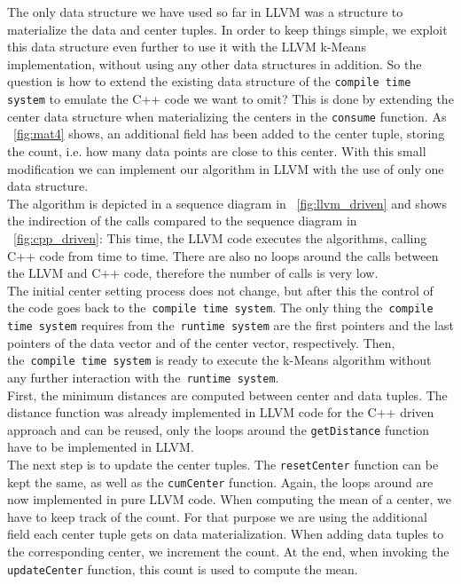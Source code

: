 The only data structure we have used so far in LLVM was a structure to materialize the data and center tuples. In order to keep things simple, we exploit this data structure even further to use it with the LLVM k-Means implementation, without using any other data structures in addition.
So the question is how to extend the existing data structure of the \texttt{compile time system} to emulate the C++ code we want to omit? This is done by extending the center data structure when materializing the centers in the \texttt{consume} function. As ~\autoref{fig:mat4} shows, an additional field has been added to the center tuple, storing the count, i.e. how many data points are close to this center. With this small modification we can implement our algorithm in LLVM with the use of only one data structure.
\\
The algorithm is depicted in a sequence diagram in ~\autoref{fig:llvm_driven} and shows the indirection of the calls compared to the sequence diagram in ~\autoref{fig:cpp_driven}: This time, the LLVM code executes the algorithms, calling C++ code from time to time. There are also no loops around the calls between the LLVM and C++ code, therefore the number of calls is very low. 
\\
The initial center setting process does not change, but after this the control of the code goes back to the~\texttt{compile time system}. The only thing the~\texttt{compile time system} requires from the~\texttt{runtime system} are the first pointers and the last pointers of the data vector and of the center vector, respectively. Then, the~\texttt{compile time system} is ready to execute the k-Means algorithm without any further interaction with the~\texttt{runtime system}. 
\\
First, the minimum distances are computed between center and data tuples. The distance function was already implemented in LLVM code for the C++ driven approach and can be reused, only the loops around the \texttt{getDistance} function have to be implemented in LLVM. 
\\
The next step is to update the center tuples. The \texttt{resetCenter} function can be kept the same, as well as the \texttt{cumCenter} function. Again, the loops around are now implemented in pure LLVM code. When computing the mean of a center, we have to keep track of the count. For that purpose we are using the additional field each center tuple gets on data materialization. When adding data tuples to the corresponding center, we increment the count. At the end, when invoking the \texttt{updateCenter} function, this count is used to compute the mean. 



